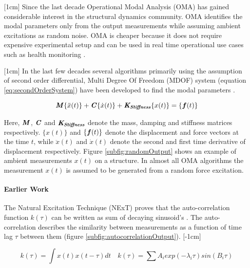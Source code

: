 [1cm]
Since the last decade Operational Modal Analysis (OMA) has gained considerable interest in the structural dynamics community. OMA identifies the modal parameters only from the output measurements while assuming ambient excitations as random noise. OMA is cheaper because it does not require expensive experimental setup and can be used in real time operational use cases such as health monitoring \cite{peeters2005industrial, shahdin2010correlating, rainieri2007automated}. 

[1cm]
In the last few decades several algorithms primarily using the assumption of second order differential, Multi Degree Of Freedom (MDOF) system (equation \ref{eq:secondOrderSystem}) have been developed to find the modal parameters \cite{guillaume2003poly, richardson1982parameter}.

\begin{equation}\label{eq:secondOrderSystem}
    \bm{\mathit{M}}\{\ddot{x}(t)\} + \bm{\mathit{C}}\{\dot{x}(t)\} + \bm{\mathit{K_{Stiffness}}}\{x(t)\} = \{\boldsymbol{f}(t)\}
\end{equation}

Here, $\bm{\mathit{M}}$, $\bm{\mathit{C}}$ and $\bm{\mathit{K_{Stiffness}}}$ denote the mass, damping and stiffness matrices respectively. $\{x(t)\}$ and $\{\boldsymbol{f}(t)\}$ denote the displacement and force vectors at the time $t$, while $\ddot{x}(t)$ and $\dot{x}(t)$ denote the second and first time derivative of displacement respectively. Figure \ref{subfig:randomOutput} shows an example of ambient measurements $x(t)$ on a structure.  In almost all OMA algorithms the measurement $x(t)$ is assumed to be generated from a random force excitation. 

\paragraph{Earlier Work}
The Natural Excitation Technique (NExT) \cite{james1995natural} proves that the auto-correlation function $k(\tau)$ can be written as sum of decaying sinusoid's \cite{spitznogle1970representation, ibrahim1977method, guillaume2003poly}. The auto-correlation describes the similarity between measurements as a function of time lag $\tau$ between them (figure \ref{subfig:autocorrelationOutput}).  
[-1cm]

\begin{equation}\label{eq:NeXT}
    k(\tau) = \int x(t)x(t-\tau)dt \quad k(\tau) = \sum A_{i}exp(-\lambda_{i}\tau)sin(B_{i}\tau)
\end{equation}

